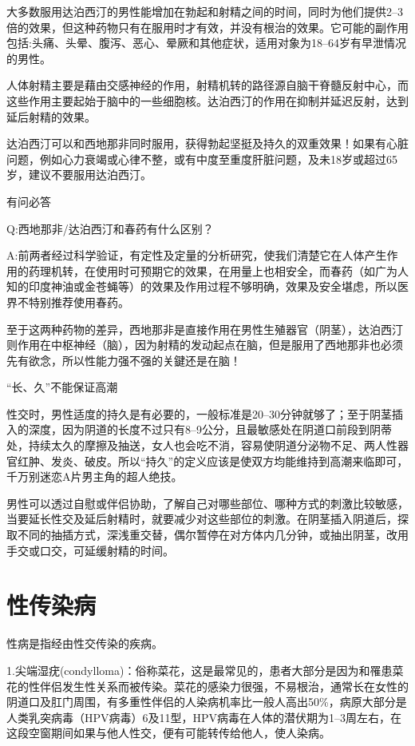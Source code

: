 \documentclass[12pt,UTF8]{ctexbook}
\begin{document}
大多数服用达泊西汀的男性能增加在勃起和射精之间的时间，同时为他们提供2--3倍的效果，但这种药物只有在服用时才有效，并没有根治的效果。它可能的副作用包括:头痛、头晕、腹泻、恶心、晕厥和其他症状，适用对象为18--64岁有早泄情况的男性。

人体射精主要是藉由交感神经的作用，射精机转的路径源自脑干脊髓反射中心，而这些作用主要起始于脑中的一些细胞核。达泊西汀的作用在抑制并延迟反射，达到延后射精的效果。

达泊西汀可以和西地那非同时服用，获得勃起坚挺及持久的双重效果！如果有心脏问题，例如心力衰竭或心律不整，或有中度至重度肝脏问题，及未18岁或超过65岁，建议不要服用达泊西汀。

有问必答

Q:西地那非/达泊西汀和春药有什么区别？

A:前两者经过科学验证，有定性及定量的分析研究，使我们清楚它在人体产生作用的药理机转，在使用时可预期它的效果，在用量上也相安全，而春药（如广为人知的印度神油或金苍蝇等）的效果及作用过程不够明确，效果及安全堪虑，所以医界不特别推荐使用春药。

至于这两种药物的差异，西地那非是直接作用在男性生殖器官（阴茎），达泊西汀则作用在中枢神经（脑），因为射精的发动起点在脑，但是服用了西地那非也必须先有欲念，所以性能力强不强的关鍵还是在脑！

“长、久”不能保证高潮

性交时，男性适度的持久是有必要的，一般标准是20--30分钟就够了；至于阴茎插入的深度，因为阴道的长度不过只有8--9公分，且最敏感处在阴道口前段到阴蒂处，持续太久的摩擦及抽送，女人也会吃不消，容易使阴道分泌物不足、两人性器官红肿、发炎、破皮。所以“持久”的定义应该是使双方均能维持到高潮来临即可，千万别迷恋A片男主角的超人绝技。

男性可以透过自慰或伴侣协助，了解自己对哪些部位、哪种方式的刺激比较敏感，当要延长性交及延后射精时，就要减少对这些部位的刺激。在阴茎插入阴道后，探取不同的抽插方式，深浅重交替，偶尔暂停在对方体内几分钟，或抽出阴茎，改用手交或口交，可延缓射精的时间。

\part{性传染病}

性病是指经由性交传染的疾病。

1.尖端湿疣(condylloma)：俗称菜花，这是最常见的，患者大部分是因为和罹患菜花的性伴侣发生性关系而被传染。菜花的感染力很强，不易根治，通常长在女性的阴道口及肛门周围，有多重性伴侣的人染病机率比一般人高出50\%，病原大部分是人类乳突病毒（HPV病毒）6及11型，HPV病毒在人体的潜伏期为1--3周左右，在这段空窗期间如果与他人性交，便有可能转传给他人，使人染病。
\end{document}
